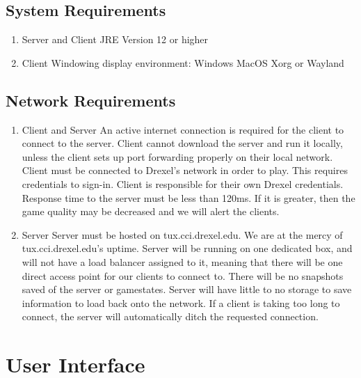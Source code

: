 \documentclass{scrreprt}
\begin{document}
\section{System Requirements}

\begin{enumerate}[label*=S\arabic*.]
    \item Server and Client
        \subitem JRE Version 12 or higher
    \item Client
        \subitem Windowing display environment:
            \subsubitem Windows
            \subsubitem MacOS
            \subsubitem Xorg or Wayland
\end{enumerate}

\section{Network Requirements}

\begin{enumerate}[label*=N\arabic*.]
    \item Client and Server
        \subitem An active internet connection is required for the client to connect to the server.
        \subitem Client cannot download the server and run it locally, unless the client sets up port forwarding properly on their local network.
        \subitem Client must be connected to Drexel's network in order to play. This requires credentials to sign-in. Client is responsible for their own Drexel credentials. 
        \subitem Response time to the server must be less than 120ms. If it is greater, then the game quality may be decreased and we will alert the clients.
                
    \item Server
        \subitem Server must be hosted on tux.cci.drexel.edu. We are at the mercy of tux.cci.drexel.edu's uptime.
        \subitem Server will be running on one dedicated box, and will not have a load balancer assigned to it, meaning that there will be one direct access point for our clients to connect to.
        \subitem There will be no snapshots saved of the server or gamestates. Server will have little to no storage to save information to load back onto the network.
        \subitem If a client is taking too long to connect, the server will automatically ditch the requested connection.
\end{enumerate}

\chapter{User Interface}
\end{document}
